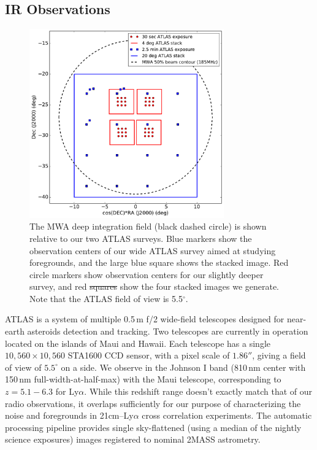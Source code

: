 \documentclass[numberedappendix]{emulateapj}
\providecommand{\DIFadd}[1]{{\protect\color{blue}\uwave{#1}}} %
\providecommand{\DIFdel}[1]{{\protect\color{red}\sout{#1}}}                      %
\providecommand{\DIFaddFL}[1]{\DIFadd{#1}} %
\providecommand{\DIFdelFL}[1]{\DIFdel{#1}} %
\providecommand{\DIFaddbeginFL}{} %
\providecommand{\DIFaddendFL}{} %
\providecommand{\DIFdelbeginFL}{} %
\providecommand{\DIFdelendFL}{} %
\begin{document}
\subsection{IR Observations}

\begin{figure}[h]
\centering
\includegraphics[width=3.3in]{survey_overview.pdf}
\caption[Diagram of the MWA deep integration field and our ATLAS surveys.]{The MWA deep integration field (black dashed circle) is shown relative to our two ATLAS surveys. Blue \DIFaddbeginFL \DIFaddFL{square }\DIFaddendFL markers show the observation centers of our wide ATLAS survey aimed at studying foregrounds, and the large blue square \DIFaddbeginFL \DIFaddFL{outline }\DIFaddendFL shows the stacked image. Red circle markers show observation centers for our slightly deeper survey, and red \DIFdelbeginFL \DIFdelFL{squares }\DIFdelendFL \DIFaddbeginFL \DIFaddFL{square outlines }\DIFaddendFL show the four stacked images we generate. Note that the ATLAS field of view is 5.5$^\circ$.}
\label{fig:surveyoverview}
\end{figure}


ATLAS is a system of multiple 0.5\,m f/2 wide-field telescopes \citep{tonry11} designed for near-earth asteroids detection and tracking. Two telescopes are currently in operation located on the islands of Maui and Hawaii.   Each telescope has a single $10,560\times10,560$ STA1600 CCD sensor, with a pixel scale of $1.86''$, giving a field of view of $5.5^\circ$ on a side.  We observe in the Johnson I band (810\,nm center with 150\,nm full-width-at-half-max) with the Maui telescope, corresponding to $z=5.1-6.3$ for Ly$\alpha$.  While this redshift range doesn't exactly match that of our radio observations, it overlaps sufficiently for our purpose of characterizing the noise and foregrounds in 21cm--Ly$\alpha$ cross correlation experiments. The automatic processing pipeline provides single sky-flattened (using a median of the nightly science exposures) images registered to nominal 2MASS astrometry.
\end{document}
